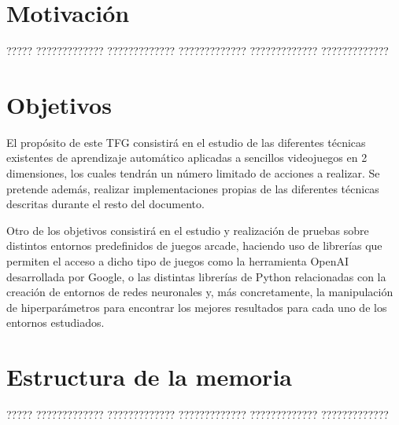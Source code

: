 \documentclass[11pt,spanish,listoffigures,listoftables]{tfgetsinf}
\begin{document}
\section{Motivaci\'on}

????? ????????????? ????????????? ????????????? ????????????? ????????????? 

\section{Objetivos}

El propósito de este TFG consistirá en el estudio de las diferentes técnicas existentes de aprendizaje automático aplicadas a sencillos videojuegos en 2 dimensiones, los cuales tendrán un número limitado de acciones a realizar. Se pretende además, realizar implementaciones propias de las diferentes técnicas descritas durante el resto del documento. \par 

Otro de los objetivos consistirá en el estudio y realización de pruebas sobre distintos entornos predefinidos de juegos arcade, haciendo uso de librerías que permiten el acceso a dicho tipo de juegos como la herramienta OpenAI desarrollada por Google, o las distintas librerías de Python relacionadas con la creación de entornos de redes neuronales y, más concretamente, la manipulación de hiperparámetros para encontrar los mejores resultados para cada uno de los entornos estudiados. \par 



\section{Estructura de la memoria}

????? ????????????? ????????????? ????????????? ????????????? ????????????? 



\end{document}
